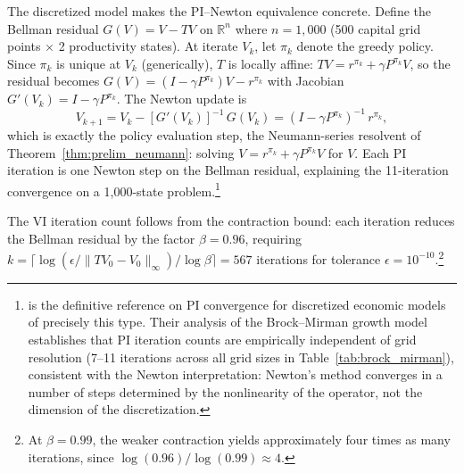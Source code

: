 The discretized model makes the PI--Newton equivalence concrete. Define the Bellman residual $G(V) = V - TV$ on $\mathbb{R}^n$ where $n = 1{,}000$ (500 capital grid points $\times$ 2 productivity states). At iterate $V_k$, let $\pi_k$ denote the greedy policy. Since $\pi_k$ is unique at $V_k$ (generically), $T$ is locally affine: $TV = r^{\pi_k} + \gamma P^{\pi_k} V$, so the residual becomes $G(V) = (I - \gamma P^{\pi_k})V - r^{\pi_k}$ with Jacobian $G'(V_k) = I - \gamma P^{\pi_k}$. The Newton update is
\begin{equation}
V_{k+1} = V_k - [G'(V_k)]^{-1}\, G(V_k) = (I - \gamma P^{\pi_k})^{-1}\, r^{\pi_k},
\label{eq:pi_newton}
\end{equation}
which is exactly the policy evaluation step, the Neumann-series resolvent of Theorem~\ref{thm:prelim_neumann}: solving $V = r^{\pi_k} + \gamma P^{\pi_k} V$ for $V$. Each PI iteration is one Newton step on the Bellman residual, explaining the 11-iteration convergence on a 1,000-state problem.\footnote{\citet{santos2004} is the definitive reference on PI convergence for discretized economic models of precisely this type. Their analysis of the Brock--Mirman growth model establishes that PI iteration counts are empirically independent of grid resolution (7--11 iterations across all grid sizes in Table~\ref{tab:brock_mirman}), consistent with the Newton interpretation: Newton's method converges in a number of steps determined by the nonlinearity of the operator, not the dimension of the discretization.}

The VI iteration count follows from the contraction bound: each iteration reduces the Bellman residual by the factor $\beta = 0.96$, requiring $k = \lceil \log(\epsilon / \|TV_0 - V_0\|_\infty) / \log \beta \rceil = 567$ iterations for tolerance $\epsilon = 10^{-10}$.\footnote{At $\beta = 0.99$, the weaker contraction yields approximately four times as many iterations, since $\log(0.96)/\log(0.99) \approx 4$.}

